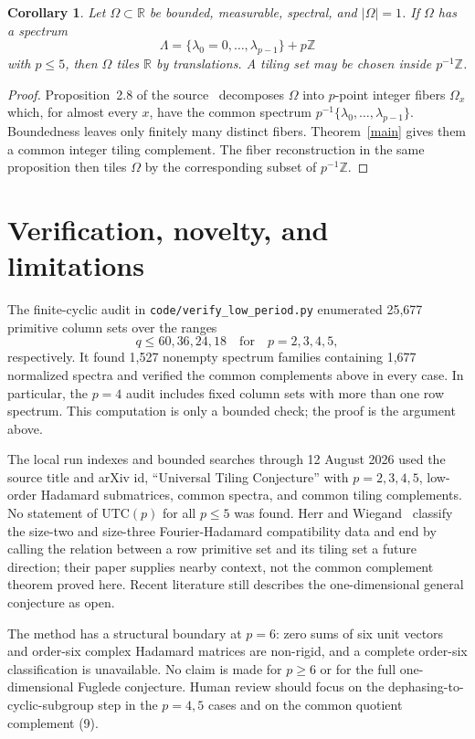 \documentclass[11pt]{article}
\newtheorem{corollary}[theorem]{Corollary}
\newcommand{\Z}{\mathbb Z}
\newcommand{\R}{\mathbb R}
\begin{document}
\begin{corollary}\label{line}
Let $\Omega\subset\R$ be bounded, measurable, spectral, and
$|\Omega|=1$.  If $\Omega$ has a spectrum
\[
 \Lambda=\{\lambda_0=0,\ldots,\lambda_{p-1}\}+p\Z
\]
with $p\le5$, then $\Omega$ tiles $\R$ by translations.  A tiling set
may be chosen inside $p^{-1}\Z$.
\end{corollary}

\begin{proof}
Proposition~2.8 of the source~\cite{source} decomposes $\Omega$ into
$p$-point integer fibers $\Omega_x$ which, for almost every $x$, have
the common spectrum
$p^{-1}\{\lambda_0,\ldots,\lambda_{p-1}\}$.  Boundedness leaves only
finitely many distinct fibers.  Theorem~\ref{main} gives them a common
integer tiling complement.  The fiber reconstruction in the same
proposition then tiles $\Omega$ by the corresponding subset of
$p^{-1}\Z$.
\end{proof}

\section{Verification, novelty, and limitations}

The finite-cyclic audit in \texttt{code/verify\_low\_period.py} enumerated
25,677 primitive column sets over the ranges
\[
 q\le60,36,24,18\quad\text{for}\quad p=2,3,4,5,
\]
respectively.  It found 1,527 nonempty spectrum families containing
1,677 normalized spectra and verified the common complements above in
every case.  In particular, the $p=4$ audit includes fixed column sets
with more than one row spectrum.  This computation is only a bounded
check; the proof is the argument above.

The local run indexes and bounded searches through 12 August 2026 used
the source title and arXiv id, ``Universal Tiling Conjecture'' with
$p=2,3,4,5$, low-order Hadamard submatrices, common spectra, and common
tiling complements.  No statement of $\mathrm{UTC}(p)$ for all
$p\le5$ was found.  Herr and Wiegand~\cite{herrwiegand} classify the
size-two and size-three Fourier-Hadamard compatibility data and end by
calling the relation between a row primitive set and its tiling set a
future direction; their paper supplies nearby context, not the common
complement theorem proved here.  Recent literature still describes the
one-dimensional general conjecture as open.

The method has a structural boundary at $p=6$: zero sums of six unit
vectors and order-six complex Hadamard matrices are non-rigid, and a
complete order-six classification is unavailable.  No claim is made for
$p\ge6$ or for the full one-dimensional Fuglede conjecture.  Human review
should focus on the dephasing-to-cyclic-subgroup step in the $p=4,5$
cases and on the common quotient complement (9).
\end{document}
